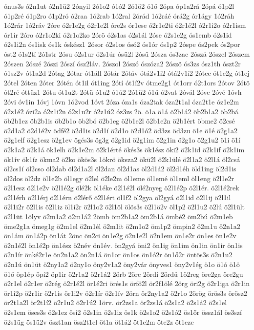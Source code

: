 {ónus3s
ó2n1ut
ó2n1ü2
2ónyil
2ó1o2
ó1ó2
2ó1ö2
ó1ő
2ópa
óp1a2rá
2ópá
ó1p2l
ó1p2ré
ó1p2ro
ó1p2ró
ó2raa
1ó2rab
1ó2ral
2órád
1ó2ráé
órá2g
ór1ágy
1ó2ráh
1ó2rár
1ó2ráv
2óre
ó2r1e2g
ó2r1e2l
óre2s
ór1ese
ó2r1e2ti
ó2r1é2l
ó2r1i2o
ó2r1ism
ór1ír
2óro
ó2r1o2ki
ó2r1o2ko
2órö
ó2s1as
ó2s1ál
2óse
ó2s1e2g
ós1emb
ó2s1id
ó2s1i2n
ós1isk
ós1k
óskész1
2ósor
ó2s1os
ósó2
ós1ór
ós1p2
2óspe
ós2pek
ós2por
óst2
ó1s2tí
2ó1str
2ósu
ó2s1ur
ó2s1úr
ósü2l
2ósű
2ósza
ós3zac
2ószá
2ószel
2ószem
2ószen
2ószé
2ószi
2ószí
ósz2láv.
2ószol
2ószó
ószóza2
2ószö
ós3zs
ósz1th
ószt2r
ó1sz2v
ót1a2d
2ótag
2ótar
ót1áll
2ótár
2ótáv
ótá2v1i2
ótá2v1í2
2ótec
ót1e2g
ót1ej
2ótel
2óten
2óter
2ótén
ót1il
ót1ing
2ótí
ót1í2v
ótme2g1
ót1orr
ó2t1ors
2ótov
2ótö
ót2ré
óttűz1
2ótu
ót1u2t
2ótü
ó1u2
ó1ú2
2ó1ü2
ó1ű
ó2vat
2óvál
2óve
2óvé
1óvh
2óvi
óv1in
1óvj
1óvn
1ó2vod
1óvt
2óza
óza1s
óza2tak
óza2t1al
óza2t1e
óz1e2m
ó2z1é2
ózi2a
ó2z1i2n
ó2z1u2r
ó2z1ú2
óz3zs
2ö.
ö1a
ö1á
ö2b1á2
öb2b1a2
öb2bá
öb2b1ez
öb2b1is
öb2b1o
öb2bó
ö2b1eg
ö2b1e2l
ö2b1e2n
ö2b1ért
öbme2
ö2csé
ö2d1a2
ö2d1é2v
ödfé2
ö2d1is
ö2d1í
ö2d1o
ö2d1ó2
öd3zs
öd3zu
ö1e
ö1é
ö2g1a2
ö2g1elf
ö2g1esz
ö2g1ev
ögés3s
ög3g
ö2g1id
ö2g1im
ö2g1in
ö2g1o
ö2g1u2
ö1i
ö1í
ö2k1a2
ö2k1á
ök1elh
ö2k1e2m
ö2k1érté
ökés3s
ök1ész
öki2
ö2k1id
ö2k1if
ö2k1im
ök1ív
ök1íz
ökma2
ö2ko
ökös3s
1ökrö
öksza2
ökü2l
ö2k1ülé
ö2l1a2
ö2l1á
öl2csá
öl2cs1í
öl2cso
öl2dab
öl2d1a2l
öl2dan
öl2d1as
öl2d1á2
öl2d1éh
öld1ing
öl2d1is
öl2dos
öl2dz
öl1e2b
öl1egy
ö2lel
ö2le2m
öl1eme
öl1emé
öl1eml
öl1eng
ö2l1e2r
ö2l1esz
ö2l1e2v
ö2l1é2g
ölé2k
öl1éke
ö2l1é2l
ölé2nyeg
ö2l1é2p
ö2l1ér.
ö2l1é2rek
ö2l1érh
ö2l1érj
ö2l1érn
ö2lérő
ö2l1ért
öl1f2
öl2gya
öl2gyá
ö2l1id
ö2l1ij
ö2l1il
ö2l1i2r
ö2l1is
ö2l1iz
öl1í2r
ö2l1o2
ö2l1öl
ölös3s
ö2l1ö2v
öl1p2
ö2l1u2
ö2lú
ö2l1ült
ö2l1üt
1ölyv
ö2m1a2
ö2m1á2
2ömb
öm2b1a2
öm2b1á
ömbé2
öm2bú
ö2m1eb
öme2g1a
ömeg1g
ö2m1el
ö2m1él
ö2m1it
ö2m1o2
öm1p2
ömpin2
ö2m1u
ö2n1a2
ön1ám
ön1á2p
ön1át
2önc
ön2ci
ön1e2g
ö2n1e2l
ö2n1em
ön1e2r
ön1es
ön1e2v
ö2n1é2l
ön1é2p
ön1ész
ö2név
ön1év.
ön2gyá
öni2
ön1ig
ön1im
ön1in
ön1ir
ön1is
ö2n1ír
önké2r1e
ön2n1a2
ön2n1á
ön1or
ön1os
ön1ó2r
ön1ő2r
öntös3s
ö2n1u2
ö2n1ú
ön1üt
ö2ny1a2
ö2ny1o
öny2v1a2
öny2vár
önyves1
öny2v1ég
ö1o
ö1ó
ö1ö
ö1ő
öp1ép
öpi2
öp1ir
ö2r1a2
ö2r1á2
2örb
2örc
2ördí
2ördü
1ö2reg
öre2ga
öre2gu
ö2r1el
ö2r1er
ö2rég
ö2r1é2l
ör1é2ri
örés1s
örfö2l
ör2f1ölé
2örg
öri2g
ö2r1iga
ö2r1in
ör1i2p
ö2r1ir
ö2r1is
ör1i2v
ö2r1ír
ö2r1ív
2örn
ör2ny1a2
ö2r1o
2örög
örös3s
örösz2
ör2t1a2l
ör2t1í2
ö2r1u2
ö2r1ú2
1örv.
ör2zs1a
ör2zs1á
ö2s1a2
ö2s1á2
ö2s1el
ö2s1em
öses3s
ö2s1ez
ösi2
ö2s1in
ö2s1iz
ös1k
ö2s1o2
ö2s1ó2
ös1őr
össz1ál
ös3szí
ö2s1üg
ös1ü2v
öszt1an
ösz2t1el
öt1a
öt1á2
öt1e2m
öte2z
öt1eze
}
